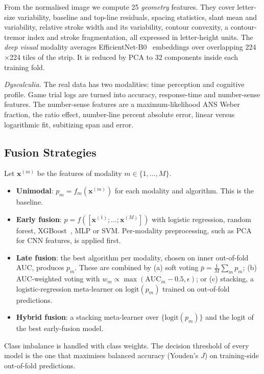 \documentclass[conference]{IEEEtran}
\begin{document}
From the normalised image we compute 25 \emph{geometry} features. They cover letter-size variability, baseline and
top-line residuals, spacing statistics, slant mean and variability, relative stroke width and its variability,
contour convexity, a contour-tremor index and stroke fragmentation, all expressed in letter-height units. The
\emph{deep visual} modality averages EfficientNet-B0~\cite{tan2019efficientnet} embeddings over overlapping
224$\times$224 tiles of the strip. It is reduced by PCA to 32 components inside each training fold.

\textit{Dyscalculia.} The real data has two modalities: time perception and cognitive profile. Game trial logs are
turned into accuracy, response-time and number-sense features. The number-sense features are a maximum-likelihood
ANS Weber fraction, the ratio effect, number-line percent absolute error, linear versus logarithmic fit, subitizing
span and error.

\subsection{Fusion Strategies}
Let $\mathbf{x}^{(m)}$ be the features of modality $m\in\{1,\dots,M\}$.
\begin{itemize}
  \item \textbf{Unimodal}: $p_m=f_m(\mathbf{x}^{(m)})$ for each modality and algorithm. This is the baseline.
  \item \textbf{Early fusion}: $p=f([\mathbf{x}^{(1)};\dots;\mathbf{x}^{(M)}])$ with logistic regression, random forest,
        XGBoost~\cite{chen2016xgboost}, MLP or SVM. Per-modality preprocessing, such as PCA for CNN features, is applied first.
  \item \textbf{Late fusion}: the best algorithm per modality, chosen on inner out-of-fold AUC, produces $p_m$. These are combined by
        (a) soft voting $\bar p=\frac1M\sum_m p_m$; (b) AUC-weighted voting with $w_m\propto\max(\mathrm{AUC}_m-0.5,\epsilon)$;
        or (c) stacking, a logistic-regression meta-learner on $\mathrm{logit}(p_m)$ trained on out-of-fold predictions.
  \item \textbf{Hybrid fusion}: a stacking meta-learner over $\{\mathrm{logit}(p_m)\}$ and the logit of the best early-fusion model.
\end{itemize}
Class imbalance is handled with class weights. The decision threshold of every model is the one that maximises
balanced accuracy (Youden's $J$) on training-side out-of-fold predictions.
\end{document}
